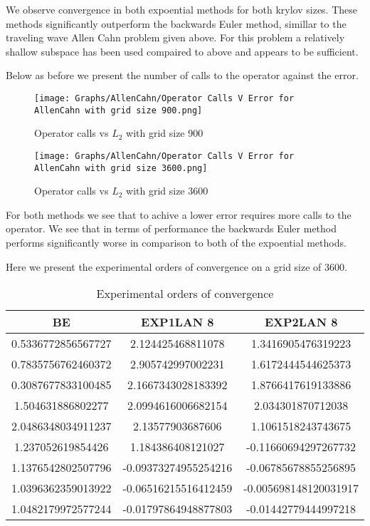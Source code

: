 We observe convergence in both expoential methods for both krylov sizes.
These methods significantly outperform the backwards Euler method, simillar to the traveling wave Allen Cahn problem given above.
For this problem a relatively shallow subspace has been used compaired to above and appears to be sufficient.

Below as before we present the number of calls to the operator against the error.
\begin{figure}[H]
    \centering
    \begin{minipage}{0.49\textwidth}
        \texttt{[image: Graphs/AllenCahn/Operator Calls V Error for AllenCahn with grid size 900.png]} %
        \caption{Operator calls vs $L_2$ with grid size 900}
        \label{fig:plot1}
    \end{minipage}\hfill
    \centering
    \begin{minipage}{0.49\textwidth}
        \texttt{[image: Graphs/AllenCahn/Operator Calls V Error for AllenCahn with grid size 3600.png]} %
        \caption{Operator calls vs $L_2$ with grid size 3600}
        \label{fig:plot2}
    \end{minipage}\hfill
\end{figure}
For both methods we see that to achive a lower error requires more calls to the operator.
We see that in terms of performance the backwards Euler method performs significantly worse in comparison to both of the expoential methods.

Here we present the experimental orders of convergence on a grid size of 3600.

\begin{table}[H]
    \centering
    \begin{tabular}{| c | c | c |}
    \hline
    BE & EXP1LAN 8 & EXP2LAN 8 \\
    \hline
    0.5336772856567727 & 2.124425468811078    & 1.3416905476319223 \\
    0.7835756762460372 & 2.905742997002231    & 1.6172444544625373 \\
    0.3087677833100485 & 2.1667343028183392   & 1.8766417619133886 \\
    1.504631886802277  & 2.0994616006682154   & 2.034301870712038 \\
    2.0486348034911237 & 2.13577903687606     & 1.1061518243743675 \\
    1.237052619854426  & 1.184386408121027    & -0.11660694297267732 \\
    1.1376542802507796 & -0.09373274955254216 & -0.06785678855256895 \\
    1.0396362359013922 & -0.06516215516412459 & -0.005698148120031917 \\
    1.0482179972577244 & -0.01797864948877803 & -0.01442779444997218 \\
    \hline
    \end{tabular}
    \caption{Experimental orders of convergence}
    \label{tab:reduced_data}
\end{table}

